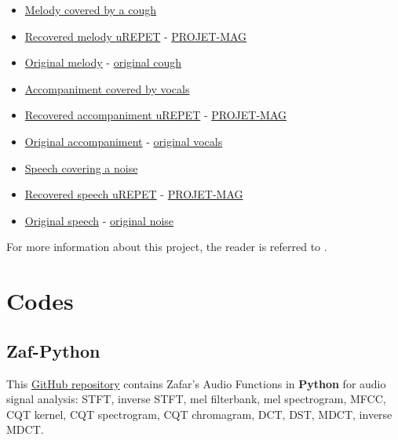\documentclass{article}
\begin{document}
\begin{itemize}[noitemsep,topsep=0pt]
\item \href{Audio/uREPET/melody&cough.wav}{Melody covered by a cough}
\item \href{Audio/uREPET/melody-cough (uREPET).wav}{Recovered melody uREPET} - \href{Audio/uREPET/melody-cough (PROJET-MAG).wav}{PROJET-MAG}
\item \href{Audio/uREPET/melody.wav}{Original melody} - \href{Audio/REPET/cough.wav}{original cough}
\end{itemize}

\begin{itemize}[noitemsep,topsep=0pt]
\item \href{Audio/uREPET/accompaniment&vocals.wav}{Accompaniment covered by vocals}
\item \href{Audio/uREPET/accompaniment-vocals (uREPET).wav}{Recovered accompaniment uREPET} - \href{Audio/uREPET/accompaniment-vocals (PROJET-MAG).wav}{PROJET-MAG}
\item \href{Audio/uREPET/accompaniment.wav}{Original accompaniment} - \href{Audio/REPET/vocals.wav}{original vocals}
\end{itemize}

\begin{itemize}[noitemsep,topsep=0pt]
\item \href{Audio/uREPET/speech&noise.wav}{Speech covering a noise}
\item \href{Audio/uREPET/speech-noise.wav (uREPET)}{Recovered speech uREPET} - \href{Audio/uREPET/speech-noise.wav (PROJET-MAG)}{PROJET-MAG}
\item \href{Audio/uREPET/speech.wav}{Original speech} - \href{Audio/REPET/noise.wav}{original noise}
\end{itemize}

For more information about this project, the reader is referred to \cite{inproceedings_fitzgerald_mar2017}.


\section{Codes}
\label{sec:codes}

\subsection{Zaf-Python}
\label{ssec:zaf-python}

This \href{https://github.com/zafarrafii/Zaf-Python}{GitHub repository} contains Zafar's Audio Functions in \textbf{Python} for audio signal analysis: STFT, inverse STFT, mel filterbank, mel spectrogram, MFCC, CQT kernel, CQT spectrogram, CQT chromagram, DCT, DST, MDCT, inverse MDCT.
\end{document}
